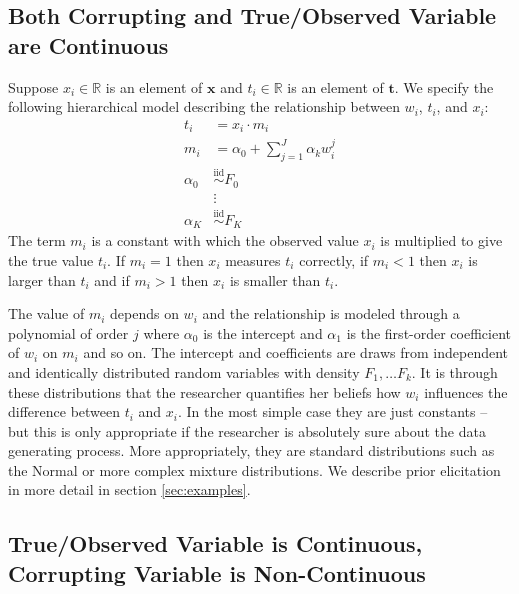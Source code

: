 \documentclass[fignum,letterpaper,12pt]{article}
\newcommand{\iid}{\stackrel{\mathrm{iid}}{\sim}}
\begin{document}
\subsection{Both Corrupting and True/Observed Variable are Continuous} \label{subsec:case1}

Suppose $x_i \in \mathbb{R}$ is an element of $\mathbf{x}$ and $t_i \in \mathbb{R}$ is an element of $\mathbf{t}$. We specify the following hierarchical model describing the relationship between $w_i$, $t_i$, and $x_i$:
\begin{equation}
\begin{array}{rl}
t_i & = x_i \cdot m_i \\
m_i & = \alpha_0 + \sum_{j=1}^{J} \alpha_k w_i^j \\
\alpha_0 & \iid F_0\\
& \vdots \\
\alpha_K & \iid F_K
\end{array}
\end{equation}
The term $m_i$ is a constant with which the observed value $x_i$ is multiplied to give the true value $t_i$. If $m_i=1$ then $x_i$ measures $t_i$ correctly, if $m_i<1$ then $x_i$ is larger than $t_i$ and if $m_i>1$ then $x_i$ is smaller than $t_i$. 

The value of $m_i$ depends on $w_i$ and the relationship is modeled through a polynomial of order $j$ where $\alpha_0$ is the intercept and $\alpha_1$ is the first-order coefficient of $w_i$ on $m_i$ and so on. The intercept and coefficients are draws from independent and identically distributed random variables with density $F_1, \dots F_k$. It is through these distributions that the researcher quantifies her beliefs how $w_i$ influences the difference between $t_i$ and $x_i$. In the most simple case they are just constants -- but this is only appropriate if the researcher is absolutely sure about the data generating process. More appropriately, they are standard distributions such as the Normal or more complex mixture distributions. We describe prior elicitation in more detail in section \ref{sec:examples}.


\subsection{True/Observed Variable is Continuous, Corrupting Variable is Non-Continuous} \label{subsec:case2}
\end{document}
